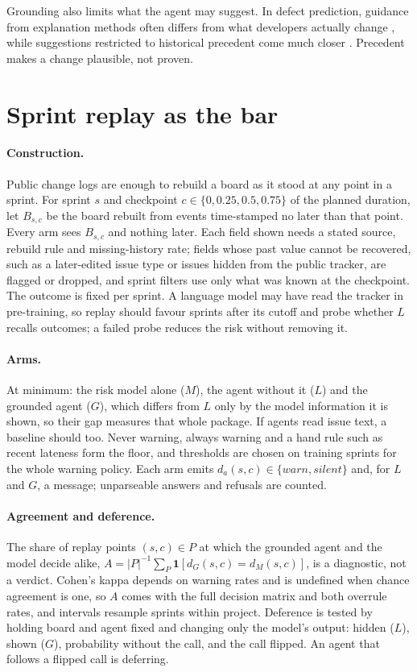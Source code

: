 \documentclass[pmlr]{jmlr}
\begin{document}
Grounding also limits what the agent may suggest. In defect prediction, guidance from explanation methods often differs from what developers actually change \citep{saner}, while suggestions restricted to historical precedent come much closer \citep{counteract}. Precedent makes a change plausible, not proven.

\section{Sprint replay as the bar}
\label{sec:replay}

\paragraph{Construction.} Public change logs \citep{tawos} are enough to rebuild a board as it stood at any point in a sprint. For sprint $s$ and checkpoint $c \in \{0, 0.25, 0.5, 0.75\}$ of the planned duration, let $B_{s,c}$ be the board rebuilt from events time-stamped no later than that point. Every arm sees $B_{s,c}$ and nothing later. Each field shown needs a stated source, rebuild rule and missing-history rate; fields whose past value cannot be recovered, such as a later-edited issue type or issues hidden from the public tracker, are flagged or dropped, and sprint filters use only what was known at the checkpoint. The outcome is fixed per sprint. A language model may have read the tracker in pre-training, so replay should favour sprints after its cutoff and probe whether $L$ recalls outcomes; a failed probe reduces the risk without removing it.

\paragraph{Arms.} At minimum: the risk model alone ($M$), the agent without it ($L$) and the grounded agent ($G$), which differs from $L$ only by the model information it is shown, so their gap measures that whole package. If agents read issue text, a baseline should too. Never warning, always warning and a hand rule such as recent lateness form the floor, and thresholds are chosen on training sprints for the whole warning policy. Each arm emits $d_a(s,c) \in \{\textit{warn}, \textit{silent}\}$ and, for $L$ and $G$, a message; unparseable answers and refusals are counted.

\paragraph{Agreement and deference.} The share of replay points $(s,c) \in P$ at which the grounded agent and the model decide alike, $A = |P|^{-1} \sum_{P} \mathbf{1}[d_G(s,c) = d_M(s,c)]$, is a diagnostic, not a verdict. Cohen's kappa depends on warning rates and is undefined when chance agreement is one, so $A$ comes with the full decision matrix and both overrule rates, and intervals resample sprints within project. Deference is tested by holding board and agent fixed and changing only the model's output: hidden ($L$), shown ($G$), probability without the call, and the call flipped. An agent that follows a flipped call is deferring.
\end{document}
